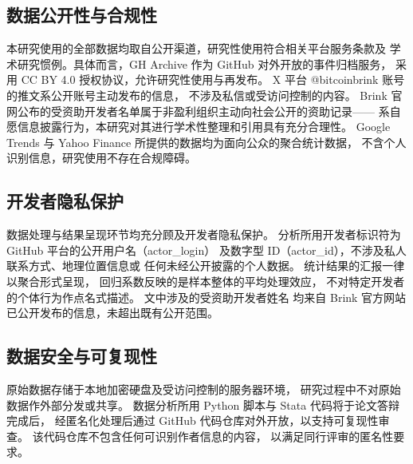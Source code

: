 \subsection{数据公开性与合规性}

本研究使用的全部数据均取自公开渠道，研究性使用符合相关平台服务条款及
学术研究惯例。具体而言，GH Archive 作为 GitHub 对外开放的事件归档服务，
采用 CC BY 4.0 授权协议，允许研究性使用与再发布。
X 平台 @bitcoinbrink 账号的推文系公开账号主动发布的信息，
不涉及私信或受访问控制的内容。
Brink 官网公布的受资助开发者名单属于非盈利组织主动向社会公开的资助记录——
系自愿信息披露行为，本研究对其进行学术性整理和引用具有充分合理性。
Google Trends 与 Yahoo Finance 所提供的数据均为面向公众的聚合统计数据，
不含个人识别信息，研究使用不存在合规障碍。

\subsection{开发者隐私保护}

数据处理与结果呈现环节均充分顾及开发者隐私保护。
分析所用开发者标识符为 GitHub 平台的公开用户名（actor\_login）
及数字型 ID（actor\_id），不涉及私人联系方式、地理位置信息或
任何未经公开披露的个人数据。
统计结果的汇报一律以聚合形式呈现，
回归系数反映的是样本整体的平均处理效应，
不对特定开发者的个体行为作点名式描述。
文中涉及的受资助开发者姓名
均来自 Brink 官方网站已公开发布的信息，未超出既有公开范围。

\subsection{数据安全与可复现性}

原始数据存储于本地加密硬盘及受访问控制的服务器环境，
研究过程中不对原始数据作外部分发或共享。
数据分析所用 Python 脚本与 Stata 代码将于论文答辩完成后，
经匿名化处理后通过 GitHub 代码仓库对外开放，以支持可复现性审查。
该代码仓库不包含任何可识别作者信息的内容，
以满足同行评审的匿名性要求。



